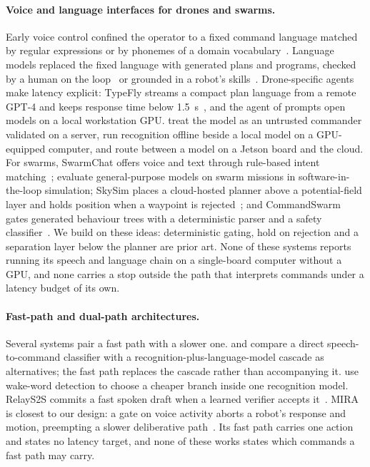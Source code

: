 \documentclass[a4paper,fleqn]{cas-dc}
\begin{document}
\paragraph{Voice and language interfaces for drones and swarms.} Early voice control confined the
operator to a fixed command language matched by regular expressions or by phonemes of a domain
vocabulary~\citep{landau2017,contreras2020}. Language models replaced the fixed language with
generated plans and programs, checked by a human on the loop~\citep{chatgptrobotics2024} or
grounded in a robot's skills~\citep{saycan2022}. Drone-specific agents make latency explicit:
TypeFly streams a compact plan language from a remote GPT-4 and keeps response time below
1.5~s~\citep{typefly2024}, and the agent of \citet{lim2025} prompts open models on a local
workstation GPU. \citet{silva2026} treat the model as an untrusted commander validated on a
server, \citet{sikorski2025} run recognition offline beside a local model on a GPU-equipped
computer, and \citet{torkamani2025} route between a model on a Jetson board and the cloud. For swarms, SwarmChat offers voice and text
through rule-based intent matching~\citep{swarmchat2025}; \citet{iannoli2026} evaluate
general-purpose models on swarm missions in software-in-the-loop simulation; SkySim places a
cloud-hosted planner above a potential-field layer and holds position when a waypoint is
rejected~\citep{skysim2026}; and CommandSwarm gates generated behaviour trees with a deterministic
parser and a safety classifier~\citep{commandswarm2026}. We build on these ideas: deterministic
gating, hold on rejection and a separation layer below the planner are prior art. None of these
systems reports running its speech and language chain on a single-board computer without a GPU, and none
carries a stop outside the path that interprets commands under a latency budget of its own.

\paragraph{Fast-path and dual-path architectures.} Several systems pair a fast path with a slower
one. \citet{simoes2024} and \citet{henry2026} compare a direct speech-to-command classifier with a
recognition-plus-language-model cascade as alternatives; the fast path replaces the cascade rather
than accompanying it. \citet{dualattn2023} use wake-word detection to choose a cheaper branch inside one
recognition model. RelayS2S commits a fast spoken draft when a learned verifier accepts
it~\citep{relays2s}. MIRA is closest to our design: a gate on voice activity aborts a robot's
response and motion, preempting a slower deliberative path~\citep{mira}. Its fast path carries one
action and states no latency target, and none of these works states which commands a fast path may
carry.
\end{document}

